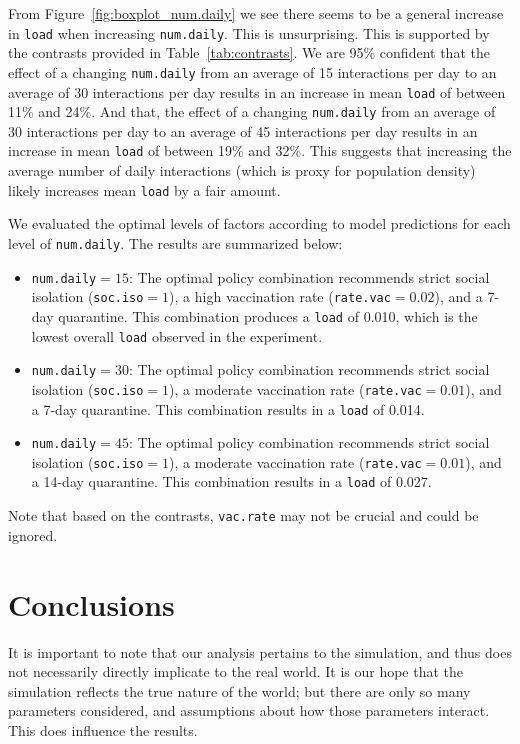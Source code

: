\documentclass[12pt,a4paper]{article}
\begin{document}
From Figure~\ref{fig:boxplot_num.daily} we see there seems to be a general increase in \verb`load` when increasing  \verb`num.daily`. This is unsurprising. This is supported by the contrasts provided in Table~\ref{tab:contrasts}. We are 95\% confident that the effect of a changing \verb`num.daily` from an average of 15 interactions per day to an average of 30 interactions per day results in an increase in mean \verb`load` of between 11\% and 24\%. And that, the effect of a changing \verb`num.daily` from an average of 30 interactions per day to an average of 45 interactions per day results in an increase in mean \verb`load` of between 19\% and 32\%. This suggests that increasing the average number of daily interactions (which is proxy for population density) likely increases mean \verb`load` by a fair amount.

We evaluated the optimal levels of factors according to model predictions for each level of \verb`num.daily`. The results are summarized below:
\begin{itemize}
	\vspace*{-3mm}
	\item \verb`num.daily`$=15$: The optimal policy combination recommends strict social isolation (\verb'soc.iso'$=1$), a high vaccination rate (\verb'rate.vac'$=0.02$), and a 7-day quarantine. This combination produces a \verb`load` of 0.010, which is the lowest overall \verb`load` observed in the experiment.
	\vspace*{-3mm}
	\item \verb`num.daily`$=30$: The optimal policy combination recommends strict social isolation (\verb`soc.iso`$=1$), a moderate vaccination rate (\verb`rate.vac`$= 0.01$), and a 7-day quarantine. This combination results in a \verb`load` of 0.014.
	\vspace*{-3mm}
	\item \verb`num.daily`$= 45$: The optimal policy combination recommends strict social isolation (\verb`soc.iso`$= 1$), a moderate vaccination rate (\verb`rate.vac`$=0.01$), and a 14-day quarantine. This combination results in a \verb`load` of 0.027.
\end{itemize}
\vspace*{-2.5mm}
Note that based on the contrasts, \verb`vac.rate` may not be crucial and could be ignored.



\section{Conclusions}\label{section4}
It is important to note that our analysis pertains to the simulation, and thus does not necessarily directly implicate to the real world. It is our hope that the simulation reflects the true nature of the world; but there are only so many parameters considered, and assumptions about how those parameters interact. This does influence the results.
\end{document}
